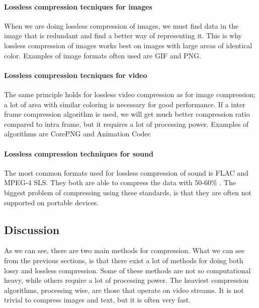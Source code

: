 \paragraph{Lossless compression tecniques for images}  \hfill \newline
When we are doing lossless compression of images, we must find data in the image that is redundant and find a better way of representing it. This is why lossless compression of images works best on images with large areas of identical color. Examples of image formats often used are GIF and PNG. \cite{bib:GIF} \cite{bib:gifsicle} \cite{bib:PNG}

\paragraph{Lossless compression tecniques for video}  \hfill \newline
The same principle holds for lossless video compression as for image compression; a lot of area with similar coloring is necessary for good performance. If a inter frame compression algorithm is used, we will get much better compression ratio compared to intra frame, but it requires a lot of processing power. Examples of algorithms are CorePNG and Animation Codec \cite{bib:corePNG} \cite{bib:animationcodec}


\paragraph{Lossless compression techniques for sound}
The most common formats used for lossless compression of sound is FLAC and MPEG-4 SLS. They both are able to compress the data with 50-60\% . The biggest problem of compressing using these standards, is that they are often not supported on portable devices.  \cite{bib:FLAC}


\subsection{Discussion}
As we can see, there are two main methods for compression. What we can see from the previous sections, is that there exist a lot of methods for doing both lossy and lossless compression. Some of these methods are not so computational heavy, while others require a lot of processing power. The heaviest compression algorithms, processing wise, are those that operate on video streams. It is not trivial to compress images and text, but it is often very fast.

